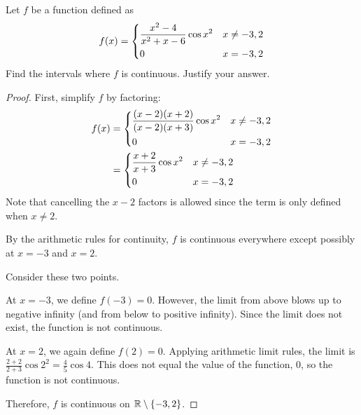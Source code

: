 \question Let $f$ be a function defined as
\begin{equation*}
  f(x) = \begin{dcases}
    \frac{x^2-4}{x^2+x-6} \cos x^2 & x \neq -3,2 \\
    0                              & x=-3,2
  \end{dcases}
\end{equation*}
Find the intervals where $f$ is continuous. Justify your answer.
\begin{proof}
  First, simplify $f$ by factoring:
  \begin{align*}
    f(x) & = \begin{dcases}
      \frac{(x-2)(x+2)}{(x-2)(x+3)} \cos x^2 & x \neq -3,2 \\
      0                                      & x=-3,2
    \end{dcases} \\
         & = \begin{dcases}
      \frac{x+2}{x+3} \cos x^2 & x \neq -3,2 \\
      0                        & x=-3,2
    \end{dcases}
  \end{align*}
  Note that cancelling the $x-2$ factors is allowed since the term is only defined when $x\neq 2$.

  By the arithmetic rules for continuity, $f$ is continuous everywhere except possibly at $x=-3$ and $x=2$.

  Consider these two points.

  At $x=-3$, we define $f(-3) = 0$.
  However, the limit from above blows up to negative infinity (and from below to positive infinity).
  Since the limit does not exist, the function is not continuous.

  At $x=2$, we again define $f(2)=0$.
  Applying arithmetic limit rules, the limit is $\frac{2+2}{2+3}\cos 2^2 = \frac{4}{5}\cos 4$.
  This does not equal the value of the function, 0, so the function is not continuous.

  Therefore, $f$ is continuous on $\mathbb{R} \setminus \{-3,2\}$.
\end{proof}

